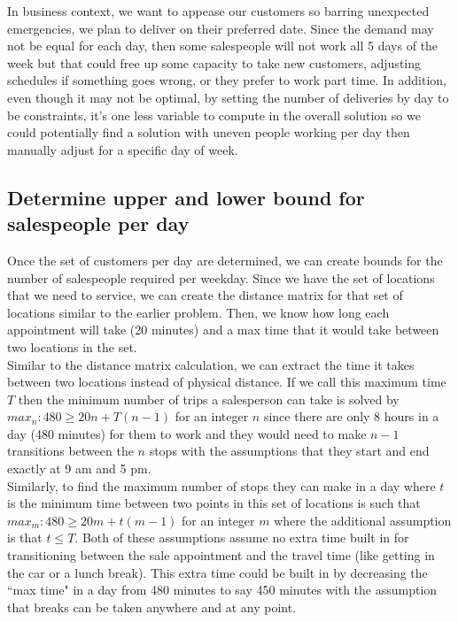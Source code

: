 \documentclass{article}
\begin{document}
In business context, we want to appease our customers so barring unexpected emergencies, we plan to deliver on their preferred date.  Since the demand may not be equal for each day, then some salespeople will not work all 5 days of the week but that could free up some capacity to take new customers, adjusting schedules if something goes wrong, or they prefer to work part time.  In addition, even though it may not be optimal, by setting the number of deliveries by day to be constraints, it's one less variable to compute in the overall solution so we could potentially find a solution with uneven people working per day then manually adjust for a specific day of week.\\

\subsection{Determine upper and lower bound for salespeople per day}
Once the set of customers per day are determined, we can create bounds for the number of salespeople required per weekday.  Since we have the set of locations that we need to service, we can create the distance matrix for that set of locations similar to the earlier problem.  Then, we know how long each appointment will take (20 minutes) and a max time that it would take between two locations in the set.\\

Similar to the distance matrix calculation, we can extract the time it takes between two locations instead of physical distance.  If we call this maximum time $T$ then the minimum number of trips a salesperson can take is solved by $max_n: 480 \geq 20n+T(n-1)$ for an integer $n$ since there are only 8 hours in a day (480 minutes) for them to work and they would need to make $n-1$ transitions between the $n$ stops with the assumptions that they start and end exactly at 9 am and 5 pm.\\

Similarly, to find the maximum number of stops they can make in a day where $t$ is the minimum time between two points in this set of locations is such that $max_m:480\geq 20m+t(m-1)$ for an integer $m$ where the additional assumption is that $t\leq T$.  Both of these assumptions assume no extra time built in for transitioning between the sale appointment and the travel time (like getting in the car or a lunch break). This extra time could be built in by decreasing the ``max time" in a day from 480 minutes to say 450 minutes with the assumption that breaks can be taken anywhere and at any point.\\
\end{document}
